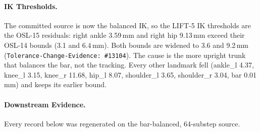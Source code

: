 \documentclass[11pt,a4paper]{article}
\begin{document}
\paragraph{IK Thresholds.} The committed source is now the balanced IK, so
the LIFT-5 IK thresholds are the OSL-15 residuals: right ankle 3.59\,mm and
right hip 9.13\,mm exceed their OSL-14 bounds (3.1 and 6.4\,mm). Both bounds
are widened to 3.6 and 9.2\,mm (\texttt{Tolerance-Change-Evidence: \#13104}).
The cause is the more upright trunk that balances the bar, not the tracking.
Every other landmark fell (ankle\_l 4.37, knee\_l 3.15, knee\_r 11.68,
hip\_l 8.07, shoulder\_l 3.65, shoulder\_r 3.04, bar 0.01\,mm) and keeps its
earlier bound.

\paragraph{Downstream Evidence.} Every record below was regenerated on the
bar-balanced, 64-substep source.
\end{document}
